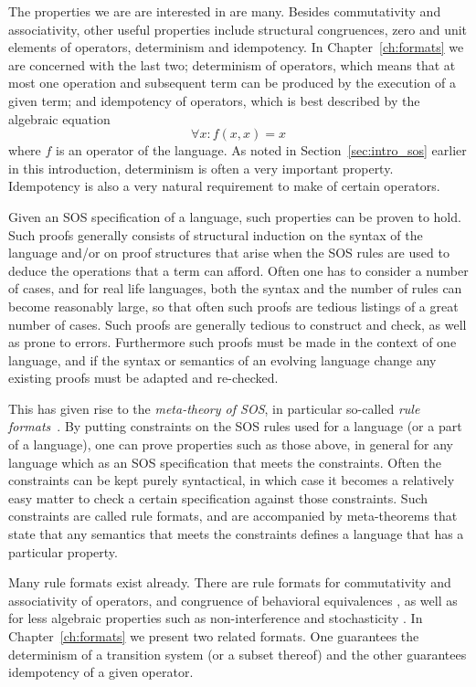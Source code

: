 The properties we are are interested in are many. Besides commutativity and
associativity, other useful properties include structural congruences, zero and
unit elements of operators, determinism and idempotency. In Chapter~\ref{ch:formats}
we are concerned with the last two; determinism of operators, which means that
at most one operation and subsequent term can be produced by the execution of
a given term; and idempotency of operators, which is best described by the algebraic
equation
\[
    \forall x : f(x,x) = x
\]
where $f$ is an operator of the language. As noted in Section~\ref{sec:intro_sos}
earlier in this introduction, determinism is often a very important property.
Idempotency is also a very natural requirement to make of certain operators.

Given an SOS specification of a language, such properties can be proven to hold.
Such proofs generally consists of structural induction on the syntax of the language
and/or on proof structures that arise when the SOS rules are used to deduce the
operations that a term can afford. Often one has to consider a number of cases,
and for real life languages, both the syntax and the number of rules can become
reasonably large, so that often such proofs are tedious listings of a great
number of cases. Such proofs are generally tedious to construct and check, as well
as prone to errors. Furthermore such proofs must be made in the context of one
language, and if the syntax or semantics of an evolving language change any existing
proofs must be adapted and re-checked.

This has given rise to the \emph{meta-theory of SOS}, in particular so-called
\emph{rule formats}~\cite{Aceto01,Mousavi07-TCS}. By putting constraints on the
SOS rules used for a language (or a part of a language), one can prove properties
such as those above, in general for any language which as an SOS specification that
meets the constraints. Often the constraints can be kept purely syntactical, in
which case it becomes a relatively easy matter to check a certain specification
against those constraints. Such constraints are called rule formats, and are
accompanied by meta-theorems that state that any semantics that meets the constraints
defines a language that has a particular property.

Many rule formats exist already. There are rule formats for 
commutativity \cite{Mousavi05-IPL} and 
associativity \cite{Mousavi08-CONCUR} of operators, and congruence of behavioral 
equivalences \cite{Verhoef95}, as well as for less algebraic properties such
as non-interference \cite{Tini04} and stochasticity \cite{Lanotte05}.
%
In Chapter~\ref{ch:formats} we present two related formats. 
One guarantees the determinism of a transition system (or a subset thereof) 
and the other guarantees idempotency of a given operator.

